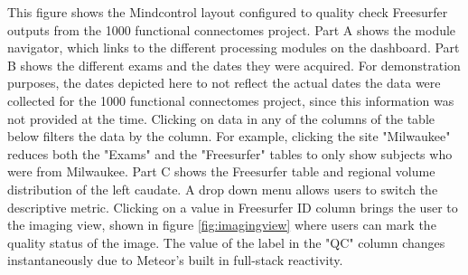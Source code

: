 \label{fig:dashboard}

This figure shows the Mindcontrol layout configured to quality check Freesurfer outputs from the 1000 functional connectomes project. Part A shows the module navigator, which links to the different processing modules on the dashboard. Part B shows the different exams and the dates they were acquired. For demonstration purposes, the dates depicted here to not reflect the actual dates the data were collected for the 1000 functional connectomes project, since this information was not provided at the time. Clicking on data in any of the columns of the table below filters the data by the column. For example, clicking the site "Milwaukee" reduces both the "Exams" and the "Freesurfer" tables to only show subjects who were from Milwaukee. Part C shows the Freesurfer table and regional volume distribution of the left caudate. A drop down menu allows users to switch the descriptive metric. Clicking on a value in Freesurfer ID column brings the user to the imaging view, shown in figure \ref{fig:imagingview} where users can mark the quality status of the image. The value of the label in the "QC" column changes instantaneously due to Meteor's built in full-stack reactivity. 